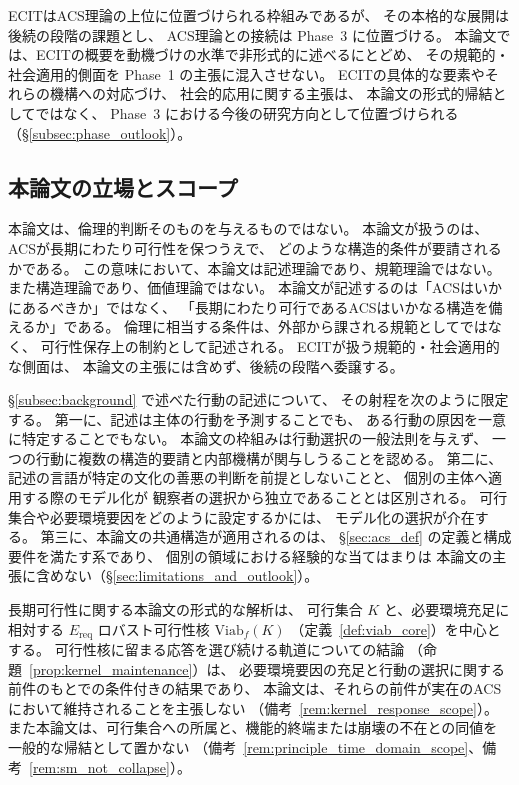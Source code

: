 ECITはACS理論の上位に位置づけられる枠組みであるが、
その本格的な展開は後続の段階の課題とし、
ACS理論との接続は Phase~3 に位置づける。
本論文では、ECITの概要を動機づけの水準で非形式的に述べるにとどめ、
その規範的・社会適用的側面を Phase~1 の主張に混入させない。
ECITの具体的な要素やそれらの機構への対応づけ、
社会的応用に関する主張は、
本論文の形式的帰結としてではなく、
Phase~3 における今後の研究方向として位置づけられる
（\S\ref{subsec:phase_outlook}）。

\subsection{本論文の立場とスコープ}
\label{subsec:scope}

本論文は、倫理的判断そのものを与えるものではない。
本論文が扱うのは、ACSが長期にわたり可行性を保つうえで、
どのような構造的条件が要請されるかである。
この意味において、本論文は記述理論であり、規範理論ではない。
また構造理論であり、価値理論ではない。
本論文が記述するのは「ACSはいかにあるべきか」ではなく、
「長期にわたり可行であるACSはいかなる構造を備えるか」である。
倫理に相当する条件は、外部から課される規範としてではなく、
可行性保存上の制約として記述される。
ECITが扱う規範的・社会適用的な側面は、
本論文の主張には含めず、後続の段階へ委譲する。

\S\ref{subsec:background} で述べた行動の記述について、
その射程を次のように限定する。
第一に、記述は主体の行動を予測することでも、
ある行動の原因を一意に特定することでもない。
本論文の枠組みは行動選択の一般法則を与えず、
一つの行動に複数の構造的要請と内部機構が関与しうることを認める。
第二に、記述の言語が特定の文化の善悪の判断を前提としないことと、
個別の主体へ適用する際のモデル化が
観察者の選択から独立であることとは区別される。
可行集合や必要環境要因をどのように設定するかには、
モデル化の選択が介在する。
第三に、本論文の共通構造が適用されるのは、
\S\ref{sec:acs_def} の定義と構成要件を満たす系であり、
個別の領域における経験的な当てはまりは
本論文の主張に含めない（\S\ref{sec:limitations_and_outlook}）。

長期可行性に関する本論文の形式的な解析は、
可行集合 $K$ と、必要環境充足に相対する
$E_{\mathrm{req}}$ ロバスト可行性核 $\mathrm{Viab}_f(K)$
（定義~\ref{def:viab_core}）を中心とする。
可行性核に留まる応答を選び続ける軌道についての結論
（命題~\ref{prop:kernel_maintenance}）は、
必要環境要因の充足と行動の選択に関する前件のもとでの条件付きの結果であり、
本論文は、それらの前件が実在のACSにおいて維持されることを主張しない
（備考~\ref{rem:kernel_response_scope}）。
また本論文は、可行集合への所属と、機能的終端または崩壊の不在との同値を
一般的な帰結として置かない
（備考~\ref{rem:principle_time_domain_scope}、備考~\ref{rem:sm_not_collapse}）。

